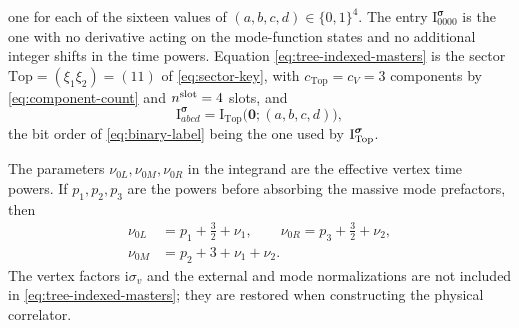 \documentclass[11pt,a4paper]{article}
\numberwithin{table}{section}
\newcommand{\ii}{\mathrm i}
\begin{document}
one for each of the sixteen values of $(a,b,c,d)\in\{0,1\}^4$.
The entry $\text{I}^{\boldsymbol\sigma}_{0000}$ is the one with no
derivative acting on the mode-function states and no additional
integer shifts in the time powers. Equation \eqref{eq:tree-indexed-masters} is the sector
$\mathrm{Top}=(\xi_1\xi_2)=(11)$ of \eqref{eq:sector-key}, with $c_{\mathrm{Top}}=c_V=3$ components
by \eqref{eq:component-count} and $n^{\rm slot}=4$ slots, and
\begin{equation}
 \text{I}^{\boldsymbol\sigma}_{abcd}
 =\text{I}_{\mathrm{Top}}\bigl(\bm 0;(a,b,c,d)\bigr),
 \label{eq:tree-top-identification}
\end{equation}
the bit order of \eqref{eq:binary-label} being the one used by $\bm{\text I}^{\boldsymbol\sigma}_{\mathrm{Top}}$.

The parameters $\nu_{0L},\nu_{0M},\nu_{0R}$ in the integrand are the
effective vertex time powers. If $p_1,p_2,p_3$ are the powers before
absorbing the massive mode prefactors, then
\begin{equation}
 \begin{aligned}
 \nu_{0L}&=p_1+\frac32+\nu_1,\qquad
 \nu_{0R}=p_3+\frac32+\nu_2,\\
 \nu_{0M}&=p_2+3+\nu_1+\nu_2.
 \end{aligned}
 \label{eq:tree-time-power-map}
\end{equation}
The vertex factors $\ii\sigma_v$ and the external and mode normalizations
are not included in \eqref{eq:tree-indexed-masters}; they are restored
when constructing the physical correlator.
\end{document}
